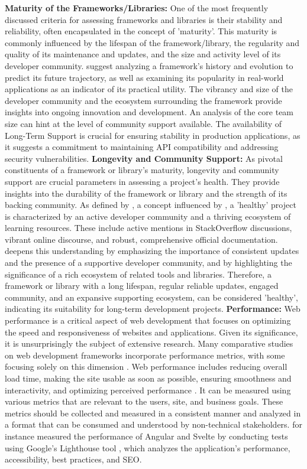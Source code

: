 \textbf{Maturity of the Frameworks/Libraries:}
One of the most frequently discussed criteria for assessing frameworks and libraries is their stability and reliability, often encapsulated in the concept of 'maturity'. This maturity is commonly influenced by the lifespan of the framework/library, the regularity and quality of its maintenance and updates, and the size and activity level of its developer community.
\cite{Khalifa.2020} suggest analyzing a framework's history and evolution to predict its future trajectory, as well as examining its popularity in real-world applications as an indicator of its practical utility. The vibrancy and size of the developer community and the ecosystem surrounding the framework provide insights into ongoing innovation and development.
An analysis of the core team size can hint at the level of community support available. The availability of Long-Term Support is crucial for ensuring stability in production applications, as it suggests a commitment to maintaining API compatibility and addressing security vulnerabilities.
\textbf{Longevity and Community Support:}
As pivotal constituents of a framework or library's maturity, longevity and community support are crucial parameters in assessing a project's health. They provide insights into the durability of the framework or library and the strength of its backing community. As defined by \cite{M.Kaluza.2019}, a concept influenced by \cite{Raible.2007}, a 'healthy' project is characterized by an active developer community and a thriving ecosystem of learning resources. These include active mentions in StackOverflow discussions, vibrant online discourse, and robust, comprehensive official documentation. \cite{Neuhaus.2017} deepens this understanding by emphasizing the importance of consistent updates and the presence of a supportive developer community, and by highlighting the significance of a rich ecosystem of related tools and libraries. Therefore, a framework or library with a long lifespan, regular reliable updates, engaged community, and an expansive supporting ecosystem, can be considered 'healthy', indicating its suitability for long-term development projects.
\textbf{Performance:}
Web performance is a critical aspect of web development that focuses on optimizing the speed and responsiveness of websites and applications. Given its significance, it is unsurprisingly the subject of extensive research. Many comparative studies on web development frameworks incorporate performance metrics, with some focusing solely on this dimension \cite{Levlin.2020, Borrelli.2021, Diniz.2022}. Web performance includes reducing overall load time, making the site usable as soon as possible, ensuring smoothness and interactivity, and optimizing perceived performance \cite{Mozilla.2023}.
It can be measured using various metrics that are relevant to the users, site, and business goals. These metrics should be collected and measured in a consistent manner and analyzed in a format that can be consumed and understood by non-technical stakeholders. \cite{Tripon.2021} for instance measured the performance of Angular and Svelte by conducting tests using Google's Lighthouse tool \cite{Lighthouse.2016}, which analyzes the application's performance, accessibility, best practices, and SEO.

